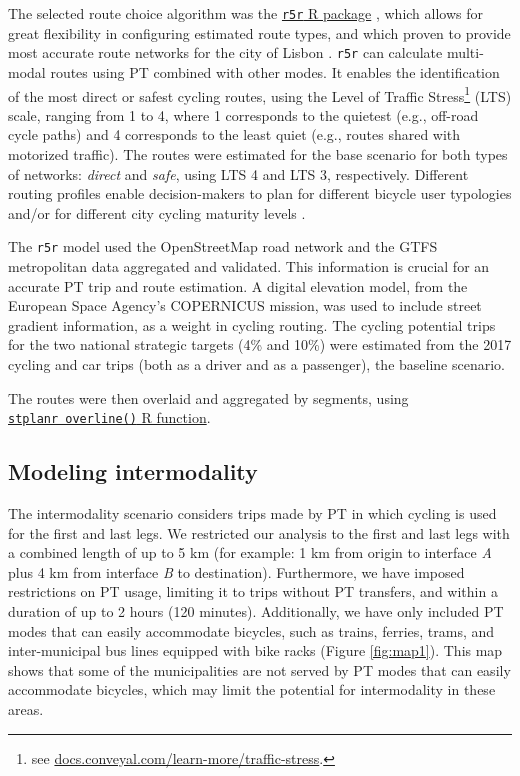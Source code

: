 \documentclass[review, doubleblind, 3p,
authoryear]{elsarticle} %
\begin{document}
The selected route choice algorithm was the
\href{https://ipeagit.github.io/r5r/}{\texttt{r5r} R package}
\citep{r5r}, which allows for great flexibility in configuring estimated
route types, and which proven to provide most accurate route networks
for the city of Lisbon \citep{Lovelace2022exploring}. \texttt{r5r} can
calculate multi-modal routes using PT combined with other modes. It
enables the identification of the most direct or safest cycling routes,
using the Level of Traffic Stress\footnote{see
  \href{https://docs.conveyal.com/learn-more/traffic-stress}{docs.conveyal.com/learn-more/traffic-stress}.}
(LTS) scale, ranging from 1 to 4, where 1 corresponds to the quietest
(e.g., off-road cycle paths) and 4 corresponds to the least quiet (e.g.,
routes shared with motorized traffic). The routes were estimated for the
base scenario for both types of networks: \emph{direct} and \emph{safe},
using LTS 4 and LTS 3, respectively. Different routing profiles enable
decision-makers to plan for different bicycle user typologies and/or for
different city cycling maturity levels \citep{felix2017}.

The \texttt{r5r} model used the OpenStreetMap road network and the GTFS
metropolitan data aggregated and validated. This information is crucial
for an accurate PT trip and route estimation. A digital elevation model,
from the European Space Agency's COPERNICUS mission, was used to include
street gradient information, as a weight in cycling routing. The cycling
potential trips for the two national strategic targets (4\% and 10\%)
were estimated from the 2017 cycling and car trips (both as a driver and
as a passenger), the baseline scenario.

The routes were then overlaid and aggregated by segments, using
\href{https://docs.ropensci.org/stplanr/reference/overline.html}{\texttt{stplanr\ overline()}
R function}.

\subsection{Modeling intermodality}\label{modeling-intermodality}

The intermodality scenario considers trips made by PT in which cycling
is used for the first and last legs. We restricted our analysis to the
first and last legs with a combined length of up to 5 km (for example: 1
km from origin to interface \emph{A} plus 4 km from interface \emph{B}
to destination). Furthermore, we have imposed restrictions on PT usage,
limiting it to trips without PT transfers, and within a duration of up
to 2 hours (120 minutes). Additionally, we have only included PT modes
that can easily accommodate bicycles, such as trains, ferries, trams,
and inter-municipal bus lines equipped with bike racks (Figure
\ref{fig:map1}). This map shows that some of the municipalities are not
served by PT modes that can easily accommodate bicycles, which may limit
the potential for intermodality in these areas.
\end{document}
